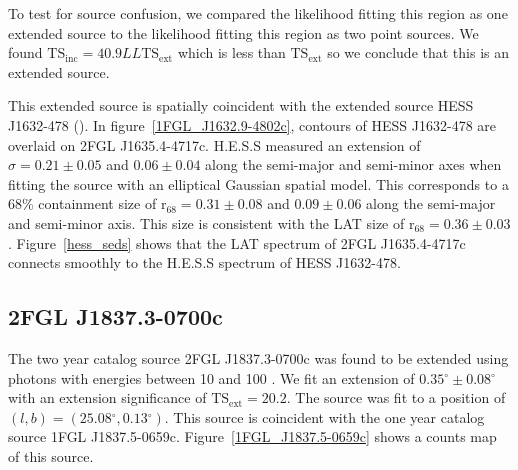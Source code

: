 \documentclass[12pt,preprint]{aastex}
\newcommand{\gev}{\text{GeV}\xspace}
\newcommand{\tev}{\text{TeV}\xspace}
\newcommand{\tsext}{{\ensuremath{\text{TS}_\text{ext}}}\xspace}
\newcommand{\tsinc}{\ensuremath{\text{TS}_\text{inc}}\xspace}
\newcommand{\loglikelihood}{\ensuremath{LL}\xspace}
\newcommand{\rsixeight}{{\ensuremath{\text{r}_{68}}}\xspace}
\renewcommand{\deg}{\ensuremath{^\circ}\xspace}
\begin{document}
To test for source confusion, we compared the likelihood fitting this
region as one extended source to the likelihood fitting this region as
two point sources. We found $\tsinc=40.9\loglikelihood\tsext$ which is less than \tsext
so we conclude that this is an extended source.

This extended source is spatially coincident with the extended \tev source HESS
J1632-478 (\cite{hess_plane_survey}).  In figure~\ref{1FGL_J1632.9-4802c},
contours of  HESS J1632-478 are overlaid on 2FGL J1635.4-4717c.
H.E.S.S measured an extension of $\sigma=0.21\pm0.05$ and
$0.06\pm0.04$ along the semi-major and semi-minor axes when fitting the source
with an elliptical Gaussian spatial model.  This corresponds to a 68\%
containment size of $\rsixeight=0.31\pm0.08$ and $0.09\pm0.06$ along the
semi-major and semi-minor axis. This size is consistent with the LAT size of
$\rsixeight=0.36\pm0.03$.
Figure~\ref{hess_seds} shows that the LAT spectrum of
2FGL J1635.4-4717c connects smoothly to the 
H.E.S.S spectrum of HESS J1632-478.


\subsection{2FGL J1837.3-0700c}
\label{section_2FGL_J1837.3-0700c}




The two year catalog source 2FGL J1837.3-0700c was found to be
extended using photons with energies between 10 \gev and 100 \gev.
We fit an extension of $0.35\deg\pm0.08\deg$ with an extension
significance of $\tsext=20.2$.  The source was fit to a position of
$(l,b)=(25.08\deg,0.13\deg)$.  This source is coincident with the one
year catalog source 1FGL J1837.5-0659c.  Figure~\ref{1FGL_J1837.5-0659c}
shows a counts map of this source.
\end{document}
